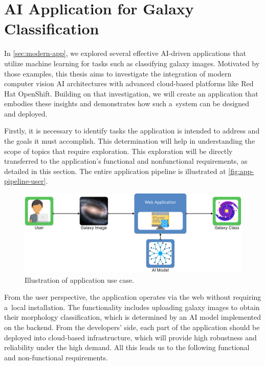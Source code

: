 \section{AI Application for Galaxy Classification}
\label{sec:ai-app}

In \autoref{sec:modern-app}, we explored several effective AI-driven applications that utilize machine learning for tasks such as classifying galaxy images. Motivated by those examples, this thesis aims to investigate the integration of modern computer vision AI architectures with advanced cloud-based platforms like Red Hat OpenShift. Building on that investigation, we will create an application that embodies these insights and demonstrates how such a~system can be designed and deployed.

\medskip

Firstly, it is necessary to identify tasks the application is intended to address and the goals it must accomplish. This determination will help in understanding the scope of topics that require exploration. This exploration will be directly transferred to the application's functional and nonfunctional requirements, as detailed in this section. The entire application pipeline is illustrated at \autoref{fig:app-pipeline-user}.

\begin{figure}[htbp]\centering
  \centering
  \includegraphics[width=0.8\linewidth]{obrazky-figures/04-draft/idea.png}
  \caption{Illustration of application use case.}
  \label{fig:app-pipeline-user}
\end{figure}

From the user perspective, the application operates via the web without requiring a~local installation. The functionality includes uploading galaxy images to obtain their morphology classification, which is determined by an AI model implemented on the backend. From the developers' side, each part of the application should be deployed into cloud-based infrastructure, which will provide high robustness and reliability under the high demand. All this leads us to the following functional and non-functional requirements.

